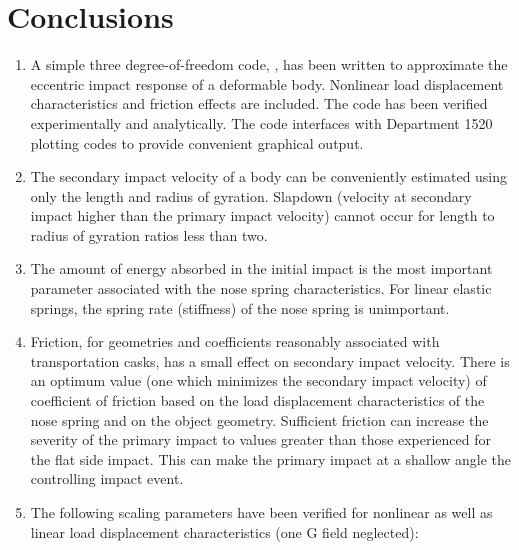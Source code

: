 \chapter{Conclusions}
\begin{enumerate}
\item {A simple three degree-of-freedom code, \SLAP ,
has been written to approximate the eccentric impact response
of a deformable body.
Nonlinear load
displacement characteristics and friction effects are included.  The
code has been verified experimentally and analytically.  The code
interfaces with Department
1520 plotting codes to provide convenient
graphical output.}

\item {The secondary impact velocity of a body
can be conveniently estimated using only the length
and radius of gyration.  Slapdown (velocity at secondary impact higher
than the primary impact velocity) cannot occur for length to radius of
gyration ratios less than two.}

\item {The amount of energy absorbed in the initial impact is the most
important parameter associated with the nose spring characteristics.
For linear elastic springs, the
spring rate (stiffness) of the nose spring is unimportant.}

\item {Friction, for geometries and coefficients reasonably associated
with transportation casks, has a small effect on secondary impact
velocity.  There is an optimum value (one which minimizes the
secondary impact velocity) of coefficient of friction based on the
load displacement characteristics of the nose spring and on the object
geometry.  Sufficient
friction can increase the severity of the
primary impact
to values greater than those
experienced for the flat side impact.  This can make the
primary impact at a shallow angle the controlling impact event.}

\item {The following scaling parameters have been verified for nonlinear
as well as linear load displacement characteristics (one G field
neglected):}
\end{enumerate}
